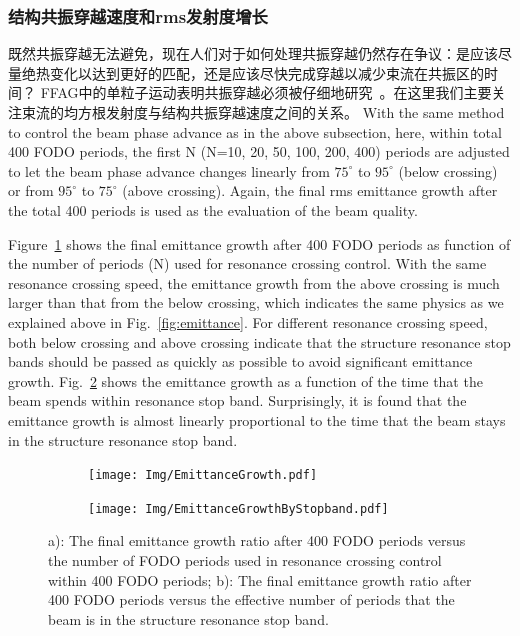 \subsubsection{结构共振穿越速度和rms发射度增长}
既然共振穿越无法避免，现在人们对于如何处理共振穿越仍然存在争议：是应该尽量绝热变化以达到更好的匹配，还是应该尽快完成穿越以减少束流在共振区的时间？
FFAG中的单粒子运动表明共振穿越必须被仔细地研究~\cite{26}。在这里我们主要关注束流的均方根发射度与结构共振穿越速度之间的关系。
 With the same method to control the
beam phase advance as in the above subsection, here, within total 400 FODO
periods, the first N (N=10, 20, 50, 100, 200, 400) periods are adjusted to let
the beam phase advance changes linearly from $75^\circ$ to  $95^\circ$ (below
crossing) or from $95^\circ$ to $75^\circ$ (above crossing). Again, the final
rms emittance growth after the total 400 periods is used as the evaluation of the beam quality.

Figure~\ref{sfig:CrossingSpeed_byStopband1} shows the final emittance growth
after 400 FODO periods as function of the number of periods (N) used for
resonance crossing control.  With the same resonance crossing speed, the
emittance growth from the above crossing is much larger than that from the below
crossing, which indicates the same physics as we explained above in
Fig.~\ref{fig:emittance}.
For different resonance crossing speed, both below crossing and above crossing
indicate that the structure resonance stop bands should be passed as quickly
as possible to avoid significant emittance growth.
Fig.~\ref{sfig:CrossingSpeed_byStopband2} shows the emittance growth as a
function of the time that the beam spends within resonance stop band.
Surprisingly, it is found that the emittance growth is almost linearly
proportional to the time that the beam stays in the structure resonance
stop band.

\begin{figure}[thbp]
    \centering
    \begin{subfigure}[b]{0.48\textwidth}
        \texttt{[image: Img/EmittanceGrowth.pdf]}
        \caption{}
        \label{sfig:CrossingSpeed_byStopband1}
    \end{subfigure}
    \begin{subfigure}[b]{0.48\textwidth}
        \texttt{[image: Img/EmittanceGrowthByStopband.pdf]}
        \caption{}
        \label{sfig:CrossingSpeed_byStopband2}
    \end{subfigure}
    \caption{
    a): The final emittance growth ratio after 400 FODO periods versus the
    number of FODO periods used in resonance crossing control within 400 FODO
    periods;
    b): The final emittance growth ratio after 400 FODO periods versus the
    effective number of periods that the beam is in the structure resonance
    stop band.}
    \label{fig:CrossingSpeed}
\end{figure}

